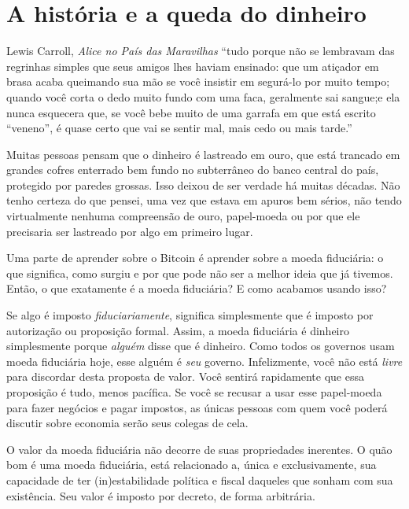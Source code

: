 \chapter{A história e a queda do dinheiro}
\label{les:12}

\begin{chapquote}{Lewis Carroll, \textit{Alice no País das Maravilhas}}
\enquote{tudo porque não se lembravam das regrinhas simples que seus amigos lhes haviam ensinado: que um atiçador em brasa acaba queimando sua mão se você insistir em segurá-lo por muito tempo; quando você corta o dedo muito fundo com uma faca, geralmente sai sangue;e ela nunca esquecera que, se você bebe muito de uma garrafa em que está escrito “veneno”, é quase certo que vai se sentir mal, mais cedo ou mais tarde.}
\end{chapquote}

Muitas pessoas pensam que o dinheiro é lastreado em ouro, que está trancado em grandes cofres enterrado bem fundo no subterrâneo do banco central do país, protegido por paredes grossas. Isso deixou de ser verdade há muitas décadas. Não tenho certeza do que pensei, uma vez que estava em apuros bem sérios, não tendo virtualmente nenhuma compreensão de ouro, papel-moeda ou por que ele precisaria ser lastreado por algo em primeiro lugar.

Uma parte de aprender sobre o Bitcoin é aprender sobre a moeda fiduciária: o que significa, como surgiu e por que pode não ser a melhor ideia que já tivemos. Então, o que exatamente é a moeda fiduciária? E como acabamos usando isso?

Se algo é imposto \textit{fiduciariamente}, significa simplesmente que é imposto por autorização ou proposição formal. Assim, a moeda fiduciária é dinheiro simplesmente porque \textit{alguém} disse que é dinheiro. Como todos os governos usam moeda fiduciária hoje, esse alguém é \textit{seu} governo. Infelizmente, você não está \textit{livre} para discordar desta proposta de valor. Você sentirá rapidamente que essa proposição é tudo, menos pacífica. Se você se recusar a usar esse papel-moeda para fazer negócios e pagar impostos, as únicas pessoas com quem você poderá discutir sobre economia serão seus colegas de cela.

O valor da moeda fiduciária não decorre de suas propriedades inerentes. O quão bom é uma moeda fiduciária, está relacionado a, única e exclusivamente, sua capacidade de ter (in)estabilidade política e fiscal daqueles que sonham com sua existência. Seu valor é imposto por decreto, de forma arbitrária.

